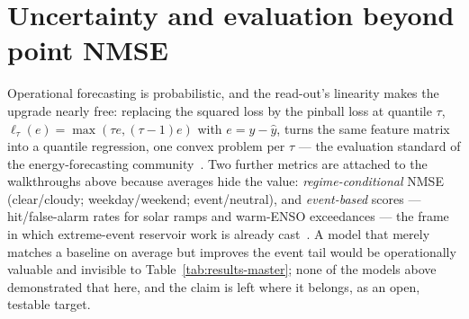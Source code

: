 \section{Uncertainty and evaluation beyond point NMSE}
\label{sec:uncertainty}

Operational forecasting is probabilistic, and the read-out's linearity makes
the upgrade nearly free: replacing the squared loss by the pinball loss at
quantile $\tau$,
$\ell_\tau(e) = \max(\tau e, (\tau-1)e)$ with $e = y - \hat y$,
turns the same feature matrix into a quantile regression, one convex problem
per $\tau$ --- the evaluation standard of the energy-forecasting
community~\citep{hong2016gefcom,hong2016load}. Two further metrics are
attached to the walkthroughs above because averages hide the value:
\emph{regime-conditional} NMSE (clear/cloudy; weekday/weekend;
event/neutral), and \emph{event-based} scores --- hit/false-alarm rates for
solar ramps and warm-ENSO exceedances --- the frame in which extreme-event
reservoir work is already cast~\citep{ahmed2024prediction}. A model that
merely matches a baseline on average but improves the event tail would be
operationally valuable and invisible to Table~\ref{tab:results-master};
none of the models above demonstrated that here, and the claim is left where
it belongs, as an open, testable target.
